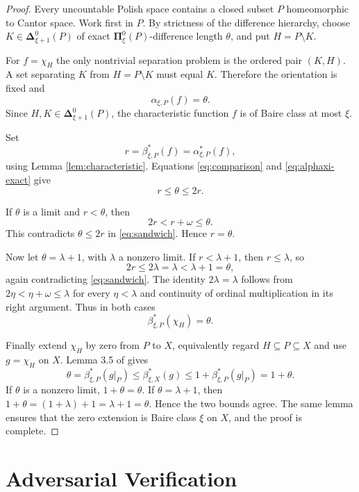 \documentclass[11pt]{article}
\newcommand{\bPi}{\boldsymbol{\Pi}}
\newcommand{\bDelta}{\boldsymbol{\Delta}}
\begin{document}
\begin{proof}
Every uncountable Polish space contains a closed subset $P$ homeomorphic to
Cantor space.  Work first in $P$.  By strictness of the difference hierarchy,
choose $K\in\bDelta^0_{\xi+1}(P)$ of exact $\bPi^0_\xi(P)$-difference length
$\theta$, and put $H=P\setminus K$.

For $f=\chi_H$ the only nontrivial separation problem is the ordered pair
$(K,H)$.  A set separating $K$ from $H=P\setminus K$ must equal $K$.
Therefore the orientation is fixed and
\begin{equation}\label{eq:alphaxi-exact}
  \alpha_{\xi,P}(f)=\theta.
\end{equation}
Since $H,K\in\bDelta^0_{\xi+1}(P)$, the characteristic function $f$ is of
Baire class at most $\xi$.

Set
\[
 r=\beta^*_{\xi,P}(f)=\alpha^*_{\xi,P}(f),
\]
using Lemma \ref{lem:characteristic}.  Equations
\eqref{eq:comparison} and \eqref{eq:alphaxi-exact} give
\begin{equation}\label{eq:sandwich}
  r\leq\theta\leq2r.
\end{equation}

If $\theta$ is a limit and $r<\theta$, then
\[
  2r<r+\omega\leq\theta.
\]
This contradicts $\theta\leq2r$ in \eqref{eq:sandwich}.  Hence $r=\theta$.

Now let $\theta=\lambda+1$, with $\lambda$ a nonzero limit.  If
$r<\lambda+1$, then $r\leq\lambda$, so
\[
  2r\leq2\lambda=\lambda<\lambda+1=\theta,
\]
again contradicting \eqref{eq:sandwich}.  The identity $2\lambda=\lambda$
follows from $2\eta<\eta+\omega\leq\lambda$ for every $\eta<\lambda$ and
continuity of ordinal multiplication in its right argument.  Thus in both
cases
\begin{equation}\label{eq:rank-on-P}
  \beta^*_{\xi,P}(\chi_H)=\theta.
\end{equation}

Finally extend $\chi_H$ by zero from $P$ to $X$, equivalently regard
$H\subseteq P\subseteq X$ and use $g=\chi_H$ on $X$.  Lemma 3.5 of \cite{LNT}
gives
\[
 \theta=\beta^*_{\xi,P}(g|_P)
 \leq\beta^*_{\xi,X}(g)
 \leq1+\beta^*_{\xi,P}(g|_P)=1+\theta.
\]
If $\theta$ is a nonzero limit, $1+\theta=\theta$.  If
$\theta=\lambda+1$, then
$1+\theta=(1+\lambda)+1=\lambda+1=\theta$.  Hence the two bounds agree.
The same lemma ensures that the zero extension is Baire class $\xi$ on $X$,
and the proof is complete.
\end{proof}

\section*{Adversarial Verification}
\end{document}
